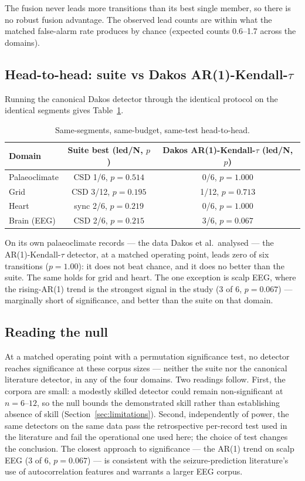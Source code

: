 \documentclass[aip,cha,preprint,amsmath,amssymb]{revtex4-2}
\begin{document}
The fusion never leads more transitions than its best single member, so
there is no robust fusion advantage. The observed lead counts are
within what the matched false-alarm rate produces by chance (expected
counts 0.6--1.7 across the domains).

\subsection{Head-to-head: suite vs Dakos AR(1)-Kendall-$\tau$}\label{sec:headtohead}

Running the canonical Dakos detector through the identical protocol on
the identical segments gives Table~\ref{tab:headtohead}.

\begin{table}[h!]
\centering
\begin{tabular}{lcc}
\toprule
Domain & Suite best (led/N, $p$) & Dakos AR(1)-Kendall-$\tau$ (led/N, $p$) \\
\midrule
Palaeoclimate & CSD 1/6, $p = 0.514$ & 0/6, $p = 1.000$ \\
Grid & CSD 3/12, $p = 0.195$ & 1/12, $p = 0.713$ \\
Heart & sync 2/6, $p = 0.219$ & 0/6, $p = 1.000$ \\
Brain (EEG) & CSD 2/6, $p = 0.215$ & 3/6, $p = 0.067$ \\
\bottomrule
\end{tabular}
\caption{Same-segments, same-budget, same-test head-to-head.}
\label{tab:headtohead}
\end{table}

On its own palaeoclimate records --- the data Dakos et al.\ analysed
--- the AR(1)-Kendall-$\tau$ detector, at a matched operating point,
leads zero of six transitions ($p = 1.00$): it does not beat chance,
and it does no better than the suite. The same holds for grid and
heart. The one exception is scalp EEG, where the rising-AR(1) trend is
the strongest signal in the study (3 of 6, $p = 0.067$) --- marginally
short of significance, and better than the suite on that domain.

\subsection{Reading the null}\label{sec:reading}

At a matched operating point with a permutation significance test, no
detector reaches significance at these corpus sizes --- neither the
suite nor the canonical literature detector, in any of the four
domains. Two readings follow. First, the corpora are small: a modestly
skilled detector could remain non-significant at $n = 6$--$12$, so the
null bounds the demonstrated skill rather than establishing absence of
skill (Section~\ref{sec:limitations}). Second, independently of power,
the same detectors on the same data pass the retrospective per-record
test used in the literature and fail the operational one used here; the
choice of test changes the conclusion. The closest approach to
significance --- the AR(1) trend on scalp EEG (3 of 6, $p = 0.067$) ---
is consistent with the seizure-prediction literature's use of
autocorrelation features and warrants a larger EEG corpus.
\end{document}
